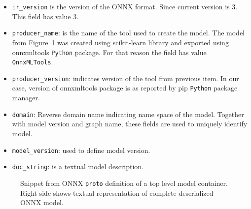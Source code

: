 \documentclass[english, 12pt, a4paper, elec, utf8, online]{aaltothesis}
\begin{document}
\begin{itemize}
\item
\texttt{ir\_version} is the version of the ONNX format. Since current version is 3. This field has value 3.
\item
\texttt{producer\_name}: is the name of the tool used to create the model. The model from Figure~\ref{fig:ModelProto} was created using scikit-learn library and exported using onnxmltools \texttt{Python} package. For that reason the field has value \texttt{OnnxMLTools}.
\item
\texttt{producer\_version}: indicates version of the tool from previous item. In our case, version of onnxmltools package is as reported by pip \texttt{Python} package manager.
\item
\texttt{domain}: Reverse domain name indicating name space of the model. Together with model version and graph name, these fields are used to uniquely identify model.
\item
\texttt{model\_version}: used to define model version.
\item
\texttt{doc\_string}: is a textual model description. 
\end{itemize}


\begin{figure}[h!]
\begin{subfigure}[t]{0.6\textwidth}

\end{subfigure}
\begin{subfigure}[t]{0.6\textwidth}

\end{subfigure}

\caption{Snippet from ONNX \texttt{proto} definition of a top level model container. Right side shows textual representation of complete deserialized ONNX model.}\label{fig:ModelProto}
\end{figure}
\end{document}
